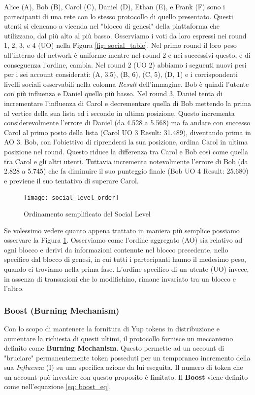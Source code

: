 Alice (A), Bob (B), Carol (C), Daniel (D), Ethan (E), e Frank (F) sono i partecipanti di una rete con lo stesso protocollo di quello presentato. Questi utenti si elencano a vicenda nel "blocco di genesi" della piattaforma che utilizzano, dal più alto al più basso. Osserviamo i voti da loro espressi nei round 1, 2, 3, e 4 (UO) nella Figura \ref{fig: social_table}. Nel primo round il loro peso all'interno del network è uniforme mentre nel round 2 e nei successivi questo, e di conseguenza l'ordine, cambia.
Nel round 2 (UO 2) abbiamo i seguenti nuovi pesi per i sei account considerati: (A, 3.5), (B, 6), (C, 5), (D, 1) e i corrispondenti livelli sociali osservabili nella colonna \textit{Result} dell'immagine. Bob è quindi l'utente con più influenza e Daniel quello più basso. Nel round 3, Daniel tenta di incrementare l'influenza di Carol e decrementare quella di Bob mettendo la prima al vertice della sua lista ed i secondo in ultima posizione. Questo incrementa considerevolmente l'errore di Daniel (da 4.528 a 5.568) ma  fa andare con successo Carol al primo posto della lista (Carol UO 3 Result: 31.489), diventando prima in AO 3. Bob, con l'obiettivo di riprendersi la sua posizione, ordina Carol in ultima posizione nel round. Questo riduce la differenza tra Carol e Bob così come quella tra Carol e gli altri utenti. Tuttavia incrementa notevolmente l'errore di Bob (da 2.828 a 5.745) che fa diminuire il suo punteggio finale (Bob UO 4 Result: 25.680) e previene il suo tentativo di superare Carol.

\begin{figure}[h!]
    \centering
    \texttt{[image: social\_level\_order]}
    \caption{Ordinamento semplificato del Social Level}
    \label{fig: social_simplified}
\end{figure}


Se volessimo vedere quanto appena trattato in maniera più semplice possiamo osservare la Figura \ref{fig: social_simplified}. Osserviamo come l'ordine aggregato (AO) sia relativo ad ogni blocco e derivi da informazioni contenute nel blocco precedente, nello specifico dal blocco di genesi, in cui tutti i partecipanti hanno il medesimo peso, quando ci troviamo nella prima fase. L'ordine specifico di un utente (UO) invece, in assenza di transazioni che lo modifichino, rimane invariato tra un blocco e l'altro.

\subsubsection{Boost (Burning Mechanism)}
Con lo scopo di mantenere la fornitura di Yup tokens in distribuzione e aumentare la richiesta di questi ultimi, il protocollo fornisce un meccanismo definito come \textbf{Burning Mechanism}. Questo permette ad un account di "bruciare" permanentemente token posseduti per un temporaneo incremento della sua \textit{Influenza} (I) su una specifica azione da lui eseguita. Il numero di token che un account può investire con questo proposito è limitato.
Il \textbf{Boost} viene definito come nell'equazione \ref{eq: boost_eq},

